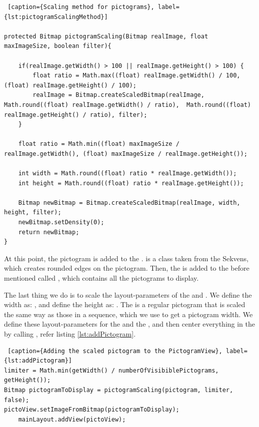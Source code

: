 \begin{lstlisting} [caption={Scaling method for pictograms}, label={lst:pictogramScalingMethod}]

protected Bitmap pictogramScaling(Bitmap realImage, float maxImageSize, boolean filter){

    if(realImage.getWidth() > 100 || realImage.getHeight() > 100) {
        float ratio = Math.max((float) realImage.getWidth() / 100, (float) realImage.getHeight() / 100);
        realImage = Bitmap.createScaledBitmap(realImage, Math.round((float) realImage.getWidth() / ratio),  Math.round((float) realImage.getHeight() / ratio), filter);
    }

    float ratio = Math.min((float) maxImageSize / realImage.getWidth(), (float) maxImageSize / realImage.getHeight());

    int width = Math.round((float) ratio * realImage.getWidth());
    int height = Math.round((float) ratio * realImage.getHeight());

    Bitmap newBitmap = Bitmap.createScaledBitmap(realImage, width, height, filter);
    newBitmap.setDensity(0);
    return newBitmap;
}
\end{lstlisting}

At this point, the pictogram is added to the .  is a class taken from the Sekvens, which creates rounded edges on the pictogram. Then, the  is added to the before mentioned  called , which contains all the pictograms to display.

The last thing we do is to scale the layout-parameters of the  and . We define the width as: , and define the height as: . The  is a regular pictogram that is scaled the same way as those in a sequence, which we use to get a pictogram width. We define these layout-parameters for the  and the , and then center everything in the  by calling , refer listing \ref{lst:addPictogram}.

\begin{lstlisting} [caption={Adding the scaled pictogram to the PictogramView}, label={lst:addPictogram}]
limiter = Math.min(getWidth() / numberOfVisibiblePictograms, getHeight());
Bitmap pictogramToDisplay = pictogramScaling(pictogram, limiter, false);
pictoView.setImageFromBitmap(pictogramToDisplay);
	mainLayout.addView(pictoView);
\end{lstlisting}

